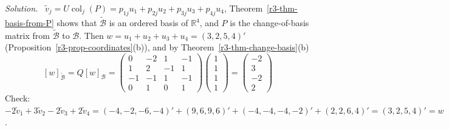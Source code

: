 \documentclass[12pt]{article}
\newcommand{\R}{\mathbb R}
\DeclareMathOperator{\col}{col}
\theoremstyle{definition}
\newenvironment{solution}{\par\noindent\textit{Solution.}\ }{\par\smallskip}
\begin{document}
\begin{solution}
\(\tilde v_j=U\col_j(P)=p_{1j}u_1+p_{2j}u_2+p_{3j}u_3+p_{4j}u_4\), Theorem~\ref{r3-thm-basis-from-P} shows that
\(\tilde{\mathcal B}\) is an ordered basis of \(\R^4\), and \(P\) is the change-of-basis matrix from
\(\tilde{\mathcal B}\) to \(\mathcal B\). Then \(w=u_1+u_2+u_3+u_4=(3,2,5,4)'\)
(Proposition~\ref{r3-prop-coordinates}(b)), and by Theorem~\ref{r3-thm-change-basis}(b)
\[
[w]_{\tilde{\mathcal B}}=Q[w]_{\mathcal B}
=\begin{pmatrix}0&-2&1&-1\\1&2&-1&1\\-1&-1&1&-1\\0&1&0&1\end{pmatrix}\begin{pmatrix}1\\1\\1\\1\end{pmatrix}
=\begin{pmatrix}-2\\3\\-2\\2\end{pmatrix}
\]
Check: \(-2\tilde v_1+3\tilde v_2-2\tilde v_3+2\tilde v_4=(-4,-2,-6,-4)'+(9,6,9,6)'+(-4,-4,-4,-2)'+(2,2,6,4)'
=(3,2,5,4)'=w\).
\end{solution}
\end{document}
